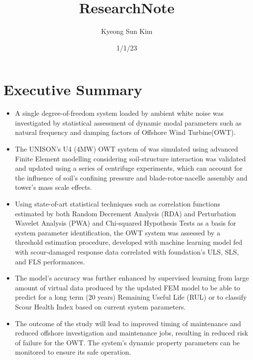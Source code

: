 \documentclass[
  letterpaper,
  DIV=11,
  numbers=noendperiod]{scrreprt}
\title{ResearchNote}
\author{Kyeong Sun Kim}
\date{1/1/23}
\renewcommand*\contentsname{Table of contents}
\newcommand\contentsname{Table of contents}
\begin{document}
\maketitle
\ifdefined\Shaded\renewenvironment{Shaded}{\begin{tcolorbox}[frame hidden, borderline west={3pt}{0pt}{shadecolor}, sharp corners, interior hidden, boxrule=0pt, enhanced, breakable]}{\end{tcolorbox}}\fi

\renewcommand*\contentsname{Table of contents}
{
\hypersetup{linkcolor=}
\setcounter{tocdepth}{2}
\tableofcontents
}

\hypertarget{executive-summary}{%
\chapter*{Executive Summary}\label{executive-summary}}


\begin{itemize}
\item
  A single degree-of-freedom system loaded by ambient white noise was
  investigated by statistical assessment of dynamic modal parameters
  such as natural frequency and damping factors of Offshore Wind
  Turbine(OWT).
\item
  The UNISON's U4 (4MW) OWT system of was simulated using advanced
  Finite Element modelling considering soil-structure interaction was
  validated and updated using a series of centrifuge experiments, which
  can account for the influence of soil's confining pressure and
  blade-rotor-nacelle assembly and tower's mass scale effects.
\item
  Using state-of-art statistical techniques such as correlation
  functions estimated by both Random Decrement Analysis (RDA) and
  Perturbation Wavelet Analysis (PWA) and Chi-squared Hypothesis Tests
  as a basis for system parameter identification, the OWT system was
  assessed by a threshold estimation procedure, developed with machine
  learning model fed with scour-damaged response data correlated with
  foundation's ULS, SLS, and FLS performances.
\item
  The model's accuracy was further enhanced by supervised learning from
  large amount of virtual data produced by the updated FEM model to be
  able to predict for a long term (20 years) Remaining Useful Life (RUL)
  or to classify Scour Health Index based on current system parameters.
\item
  The outcome of the study will lead to improved timing of maintenance
  and reduced offshore investigation and maintenance jobs, resulting in
  reduced risk of failure for the OWT. The system's dynamic property
  parameters can be monitored to ensure its safe operation.
\end{itemize}
\end{document}
